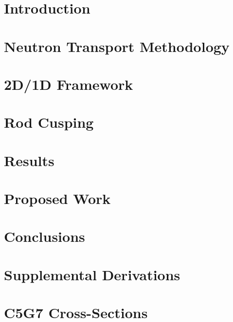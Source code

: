 \documentclass[12pt]{thesis-umich}
\begin{document}

\chapter{Introduction}\label{chap:intro}


\chapter{Neutron Transport Methodology}\label{chap:transport}


\chapter{2D/1D Framework}\label{chap:2d1d}


\chapter{Rod Cusping}\label{chap:cusping}


\chapter{Results}\label{chap:results}


\chapter{Proposed Work}\label{chap:proposed}

 
\chapter{Conclusions}\label{chap:concl}


\appendix
\chapter{Supplemental Derivations}\label{app:derivations}


\chapter{C5G7 Cross-Sections}\label{app:c5g7xs}




\end{document}
